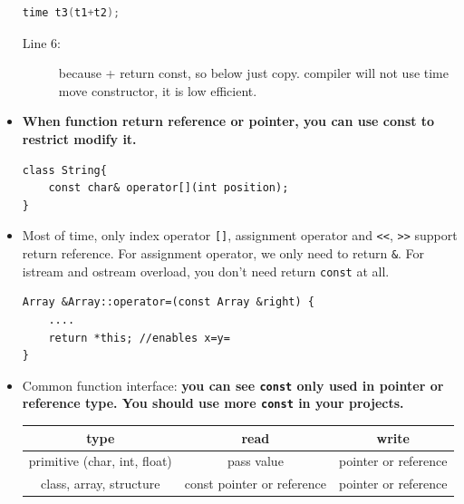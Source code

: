 \documentclass[a4paper,11pt,twoside]{book}
\newcommand{\tophline}{\hline }
\newcommand{\bottomhline}{\\ \hline }
\newcommand{\tophline}{ }
\newcommand{\bottomhline}{ }
\begin{document}
\begin{itemize}
\begin{lstlisting}[frame=single, language=c++]
time t3(t1+t2);
\end{lstlisting}
\begin{description}
	\item[Line 6:] because + return const, so below just copy. compiler will not use time move constructor, it is low efficient.
	
\end{description}
	
	\item \textbf{When function return reference or pointer, you can use const to restrict modify it.}
\begin{lstlisting}[numbers=none]
class String{
	const char& operator[](int position);
}
\end{lstlisting}
	
	\item Most of time, only index operator \verb=[]=, assignment operator and \verb|<<|, \verb|>>| support return reference. For assignment operator, we only need to return \texttt{\&}.  For istream and ostream overload, you don't need return \texttt{const} at all. 
\begin{lstlisting}[numbers=none]
Array &Array::operator=(const Array &right) {
	....
	return *this; //enables x=y= 
}
\end{lstlisting} 
	
	\item Common function interface: \textbf{you can see \texttt{const} only used in pointer or reference type. You should use more \texttt{const} in your projects. }
	
	\begin{tabular}{|c|c|c|}
		\tophline
		\textbf{type} & \textbf{read} & \textbf{write} \\ \tophline
		
		primitive (char, int, float) & pass value & pointer or reference \\ \tophline
		class, array, structure  & const pointer or reference &  pointer or reference \bottomhline
	\end{tabular}
\end{itemize}
\end{document}
